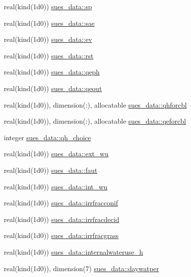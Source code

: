 \begin{DoxyCompactItemize}
real(kind(1d0)) \hyperlink{namespacesues__data_a77243f6b1c7d2baecb0d13f5d98b4318}{sues\+\_\+data\+::sp}
\item 
real(kind(1d0)) \hyperlink{namespacesues__data_ade8fa0a70d4bdc01712ae9438602f21e}{sues\+\_\+data\+::sae}
\item 
real(kind(1d0)) \hyperlink{namespacesues__data_a879c9f9f7cf8597fe30edea62a95bcdd}{sues\+\_\+data\+::ev}
\item 
real(kind(1d0)) \hyperlink{namespacesues__data_a590af4833961785e70adbad8cec1aa66}{sues\+\_\+data\+::rst}
\item 
real(kind(1d0)) \hyperlink{namespacesues__data_a9dfa646ad79f2eadc90c544d5ad4462c}{sues\+\_\+data\+::qeph}
\item 
real(kind(1d0)) \hyperlink{namespacesues__data_ae467db694bf0c56a1afbee403a0d8907}{sues\+\_\+data\+::qeout}
\item 
real(kind(1d0)), dimension(\+:), allocatable \hyperlink{namespacesues__data_a891cda3d0ef1f628e7dd9a185f00fc6c}{sues\+\_\+data\+::qhforcbl}
\item 
real(kind(1d0)), dimension(\+:), allocatable \hyperlink{namespacesues__data_a08451f44609cb386788368a9136432c7}{sues\+\_\+data\+::qeforcbl}
\item 
integer \hyperlink{namespacesues__data_a2333d97226ad99ef4b17125ad7c3b205}{sues\+\_\+data\+::qh\+\_\+choice}
\item 
real(kind(1d0)) \hyperlink{namespacesues__data_ad2e4c4ffe627921b28183c9f4d8789fd}{sues\+\_\+data\+::ext\+\_\+wu}
\item 
real(kind(1d0)) \hyperlink{namespacesues__data_abc299ffec1296474197ca5a9afb4b254}{sues\+\_\+data\+::faut}
\item 
real(kind(1d0)) \hyperlink{namespacesues__data_affbedb6f34d747605bf529fd2d80d4c7}{sues\+\_\+data\+::int\+\_\+wu}
\item 
real(kind(1d0)) \hyperlink{namespacesues__data_aec92653b01eece5fbbb4f1cdfa3575cf}{sues\+\_\+data\+::irrfracconif}
\item 
real(kind(1d0)) \hyperlink{namespacesues__data_aa6d49b1ef69f02f3bd0334c0d50d9a30}{sues\+\_\+data\+::irrfracdecid}
\item 
real(kind(1d0)) \hyperlink{namespacesues__data_ac09560182eb4e8e83479a33c9ea2f52b}{sues\+\_\+data\+::irrfracgrass}
\item 
real(kind(1d0)) \hyperlink{namespacesues__data_aaec40541d3458d50a5e554aa1ca0848b}{sues\+\_\+data\+::internalwateruse\+\_\+h}
\item 
real(kind(1d0)), dimension(7) \hyperlink{namespacesues__data_aaf929b9a25878b781ca0c2069b3e9468}{sues\+\_\+data\+::daywatper}

\end{DoxyCompactItemize}
